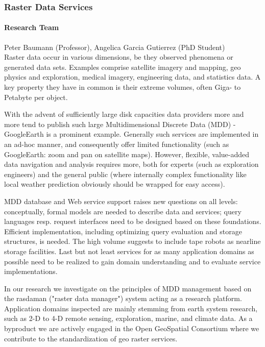 \subsubsection{Raster Data Services}
\paragraph{Research Team}
Peter Baumann (Professor), Angelica Garcia Gutierrez (PhD Student)\\

Raster data occur in various dimensions, be they observed phenomena or generated data
sets. Examples comprise satellite imagery and mapping, geo physics and exploration,
medical imagery, engineering data, and statistics data. A key property they have in common
is their extreme volumes, often Giga- to Petabyte per object.

With the advent of sufficiently large disk capacities data providers more and more tend to
publish such large Multidimensional Discrete Data (MDD) - GoogleEarth is a prominent
example. Generally such services are implemented in an ad-hoc manner, and consequently
offer limited functionality (such as GoogleEarth: zoom and pan on satellite
maps). However, flexible, value-added data navigation and analysis requires more, both for
experts (such as exploration engineers) and the general public (where internally complex
functionality like local weather prediction obviously should be wrapped for easy access).

MDD database and Web service support raises new questions on all levels: conceptually,
formal models are needed to describe data and services; query languages resp. request
interfaces need to be designed based on these foundations. Efficient implementation,
including optimizing query evaluation and storage structures, is needed. The high volume
suggests to include tape robots as nearline storage facilities. Last but not least
services for as many application domains as possible need to be realized to gain domain
understanding and to evaluate service implementations.

In our research we investigate on the principles of MDD management based on the rasdaman
("raster data manager") system acting as a research platform. Application domains
inspected are mainly stemming from earth system research, such as 2-D to 4-D remote
sensing, exploration, marine, and climate data. As a byproduct we are actively engaged in
the Open GeoSpatial Consortium where we contribute to the standardization of geo raster
services.

